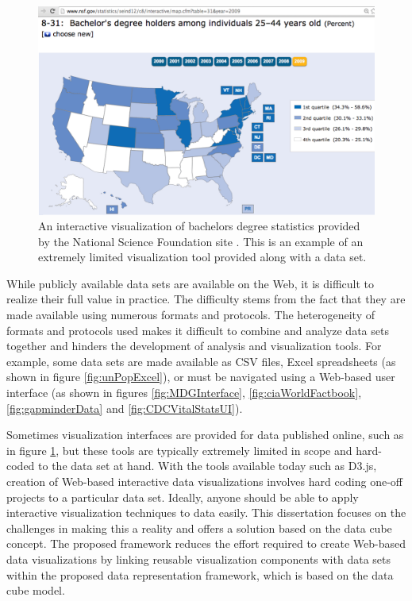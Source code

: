 \begin{figure}
  \centering
  \includegraphics[width=\figureWidth]{figs/nsfBachelorsDegrees.png}
  \caption[NSF Bachelors Degrees Statistics Choropleth Map.]
    {An interactive visualization of bachelors degree statistics provided by the National Science Foundation site \cite{nsfBachelorsDegrees}. This is an example of an extremely limited visualization tool provided along with a data set.}
  \label{fig:nsfBachelorsDegrees}
\end{figure}

While publicly available data sets are available on the Web, it is difficult to realize their full value in practice. The difficulty stems from the fact that they are made available using numerous formats and protocols. The heterogeneity of formats and protocols used makes it difficult to combine and analyze data sets together and hinders the development of analysis and visualization tools. For example, some data sets are made available as CSV files, Excel spreadsheets (as shown in figure \ref{fig:unPopExcel}), or must be navigated using a Web-based user interface (as shown in figures \ref{fig:MDGInterface}, \ref{fig:ciaWorldFactbook}, \ref{fig:gapminderData} and \ref{fig:CDCVitalStatsUI}).

Sometimes visualization interfaces are provided for data published online, such as in figure \ref{fig:nsfBachelorsDegrees}, but these tools are typically extremely limited in scope and hard-coded to the data set at hand.  With the tools available today such as D3.js, creation of Web-based interactive data visualizations involves hard coding one-off projects to a particular data set. Ideally, anyone should be able to apply interactive visualization techniques to data easily. This dissertation focuses on the challenges in making this a reality and offers a solution based on the data cube concept. The proposed framework reduces the effort required to create Web-based data visualizations by linking reusable visualization components with data sets within the proposed data representation framework, which is based on the data cube model.

